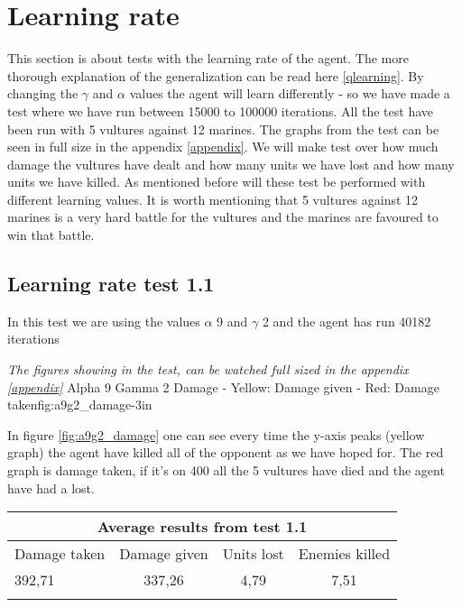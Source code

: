 \section{Learning rate}
This section is about tests with the learning rate of the agent. The more thorough explanation of the generalization can be read here \ref{qlearning}.
By changing the $\gamma$ and $\alpha$ values the agent will learn differently - so we have made a test where we have run between 15000 to 100000 iterations. All the test have been run with 5 vultures against 12 marines. The graphs from the test can be seen in full size in the appendix \ref{appendix}. We will make test over how much damage the vultures have dealt and how many units we have lost and how many units we have killed. As mentioned before will these test be performed with different learning values. It is worth mentioning that 5 vultures against 12 marines is a very hard battle for the vultures and the marines are favoured to win that battle.



\subsection*{Learning rate test 1.1}
In this test we are using the values $\alpha$ 9 and $\gamma$ 2 and the agent has run 40182 iterations


\textit{The figures showing in the test, can be watched full sized in the appendix \ref{appendix}} 
			{Alpha 9 Gamma 2 Damage - Yellow: Damage given - Red: Damage taken}{fig:a9g2_damage}{-3in}

In figure \ref{fig:a9g2_damage} one can see every time the y-axis peaks (yellow graph) the agent have killed all of the opponent as we have hoped for. The red graph is damage taken, if it's on 400 all the 5 vultures have died and the agent have had a lost.

\begin{centering}
 \begin{tabular}{|l||c|c|c|}
	\multicolumn{4}{c}{Average results from test 1.1} \\
	\hline
		Damage taken & Damage given & Units lost & Enemies killed\\
	\hline
		392,71 & 337,26 & 4,79 & 7,51 \\
	\hline
\label{test1.1}
\end{tabular}
\end{centering}

